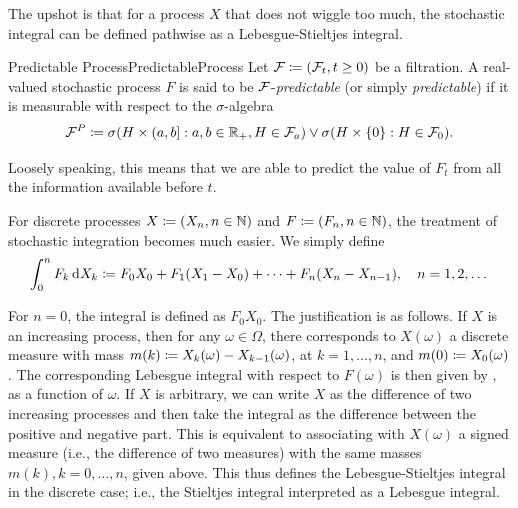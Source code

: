 The upshot is that for a process \(X\) that does not wiggle too much, the stochastic integral can be defined pathwise as a Lebesgue-Stieltjes integral.


\begin{defn}{Predictable Process}{PredictableProcess}
	Let $\mathcal{F} \coloneqq (\mathcal{F}_t, t \ge 0)$ be a filtration. A real-valued stochastic process $F$ is said to be $\mathcal{F}$-\emph{predictable} (or simply \emph{predictable}) if it is measurable with respect to the $\sigma$-algebra
	\begin{equation}\label{eq:PredictableSigmaAlgebra}
		\mathcal{F}^P \coloneqq \sigma(H \times (a, b] : a, b \in \mathbb{R}_+, H \in \mathcal{F}_a) \lor \sigma(H \times \{0\} : H \in \mathcal{F}_0).
	\end{equation}
\end{defn}

Loosely speaking, this means that we are able to predict the value of $F_t$ from all the information available before $t$.

For discrete processes $X \coloneqq (X_n, n \in \mathbb{N})$ and $F \coloneqq (F_n, n \in \mathbb{N})$, the treatment of stochastic integration becomes much easier. We simply define
\begin{equation}\label{eq:DiscreteStochasticIntegral}
	\int_0^n F_k \, \mathrm{d} X_k \coloneqq F_0 X_0 + F_1 (X_1 - X_0) + \dots + F_n (X_n - X_{n-1}), \quad n = 1, 2, \dots
\end{equation}

For $n = 0$, the integral is defined as $F_0 X_0$. The justification is as follows. If $X$ is an increasing process, then for any $\omega \in \Omega$, there corresponds to $X(\omega)$ a discrete measure with mass $m(k) \coloneqq X_k(\omega) - X_{k-1}(\omega)$, at $k = 1, \dots, n$, and $m(0) \coloneqq X_0(\omega)$. The corresponding Lebesgue integral with respect to $F(\omega)$ is then given by , as a function of $\omega$. If $X$ is arbitrary, we can write $X$ as the difference of two increasing processes and then take the integral as the difference between the positive and negative part. This is equivalent to associating with $X(\omega)$ a signed measure (i.e., the difference of two measures) with the same masses $m(k), k = 0, \dots, n$, given above. This thus defines the Lebesgue-Stieltjes integral in the discrete case; i.e., the Stieltjes integral interpreted as a Lebesgue integral.

